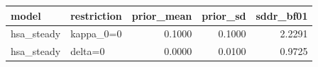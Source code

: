 \begin{tabular}{llrrr}
\toprule
model & restriction & prior\_mean & prior\_sd & sddr\_bf01 \\
\midrule
hsa\_steady & kappa\_0=0 & 0.1000 & 0.1000 & 2.2291 \\
hsa\_steady & delta=0 & 0.0000 & 0.0100 & 0.9725 \\
\bottomrule
\end{tabular}
